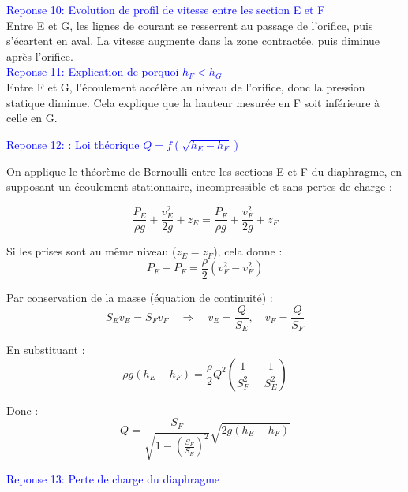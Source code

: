 	\textcolor{blue}{Reponse 10: Evolution de profil de vitesse entre les section E et F  }\\	
		Entre E et G, les lignes de courant se resserrent au passage de l’orifice, puis s’écartent en aval. La vitesse augmente dans la zone contractée, puis diminue après l’orifice. 
		\\	
	\textcolor{blue}{Reponse 11: Explication de porquoi $ h_F < h_G $} \\
		Entre F et G, l’écoulement accélère au niveau de l’orifice, donc la pression statique diminue. Cela explique que la hauteur mesurée en F soit inférieure à celle en G.
	
	
	
	
	\textcolor{blue}{Reponse 12: : Loi théorique $Q = f(\sqrt{h_E - h_F})$}
		
		
		
		On applique le théorème de Bernoulli entre les sections E et F du diaphragme, en supposant un écoulement stationnaire, incompressible et sans pertes de charge :
		
		\begin{equation}
			\frac{P_E}{\rho g} + \frac{v_E^2}{2g} + z_E = \frac{P_F}{\rho g} + \frac{v_F^2}{2g} + z_F
		\end{equation}
		
		Si les prises sont au même niveau ($z_E = z_F$), cela donne :
		\begin{equation}
			P_E - P_F = \frac{\rho}{2} (v_F^2 - v_E^2)
		\end{equation}
		
		Par conservation de la masse (équation de continuité) :
		\begin{equation}
			S_E v_E = S_F v_F \quad \Rightarrow \quad v_E = \frac{Q}{S_E}, \quad v_F = \frac{Q}{S_F}
		\end{equation}
		
		En substituant :
		\begin{equation}
			\rho g (h_E - h_F) = \frac{\rho}{2} Q^2 \left( \frac{1}{S_F^2} - \frac{1}{S_E^2} \right)
		\end{equation}
		
		Donc :
		\begin{equation}
			Q = \frac{S_F}{\sqrt{1 - \left(\frac{S_F}{S_E}\right)^2}} \sqrt{2g (h_E - h_F)}
		\end{equation}
		
		
		
	\textcolor{blue}{Reponse 13:  Perte de charge du diaphragme }
	
